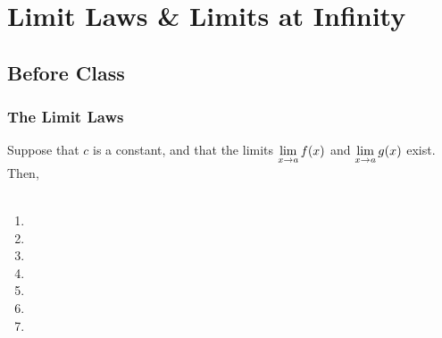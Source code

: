 \documentclass[notes]{subfiles}
\begin{document}
	\fancyhead[LO,RE]{\bfseries \small \currentname}
	\fancyfoot[C]{{}}
	\fancyfoot[LO,RE]{\large \thepage}	%

\section*{Limit Laws \& Limits at Infinity}\label{cs23}
	\subsection*{Before Class}
	\subsubsection*{The Limit Laws}
		\begin{thm}
			Suppose that \(c\) is a constant, and that the limits \(\displaystyle \lim_{x\to a} f(x)\) and \(\displaystyle \lim_{x\to a} g(x)\) exist. Then,
			\\ \\
				\begin{enumerate}
					\setlength\itemsep{40pt}
					\item 
					\item 
					\item 
					\item 
					\item 
					\item 
					\item 
				\end{enumerate}
		\end{thm}
			\newpage
\end{document}
